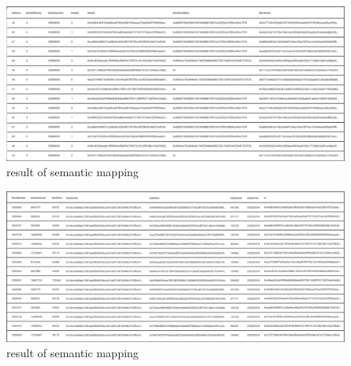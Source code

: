 \begin{center}
	\begin{figure}[htb!]
		
		\begin{minipage}{0.55\linewidth}
			\centering
			\includegraphics[width=1.95\textwidth]{images/chap03_licese_result_1.png}
		\end{minipage}
		\caption[result of semantic mapping]{result of semantic mapping}
		
	\end{figure}
	
\end{center}
\begin{center}
	\begin{figure}[htb!]
		
		\begin{minipage}{0.55\linewidth}
			\centering
			\includegraphics[width=1.95\textwidth]{images/chap03_licese_result_2.png}
		\end{minipage}
		\caption[result of semantic mapping]{result of semantic mapping}
		
	\end{figure}
	
\end{center}
